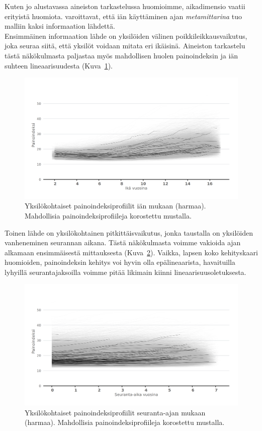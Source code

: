 \documentclass[finnish]{docopts}
\begin{document}
Kuten jo alustavassa aineiston tarkastelussa huomioimme, aikadimensio vaatii erityistä huomiota. \cite{fitzmaurice11} varoittavat, että iän käyttäminen ajan \textit{metamittarina} tuo malliin kaksi informaation lähdettä.\\

Ensimmäinen informaation lähde on yksilöiden välinen poikkileikkausvaikutus, joka seuraa siitä, että yksilöt voidaan mitata eri ikäisinä. Aineiston tarkastelu tästä näkökulmasta paljastaa myös mahdollisen huolen painoindeksin ja iän suhteen lineaarisuudesta (Kuva~\ref{fig:bmi_age}).\\

\begin{figure}[H]
\centering
  \includegraphics[scale=0.8]{kuvaajat/bmi_age.png}
  \caption{Yksilökohtaiset painoindeksiprofiilit iän mukaan (harmaa). Mahdollisia painoindeksiprofiileja korostettu mustalla.}
  \label{fig:bmi_age}
\end{figure}


Toinen lähde on yksilökohtainen pitkittäisvaikutus, jonka taustalla on yksilöiden vanheneminen seurannan aikana. Tästä näkökulmasta voimme vakioida ajan alkamaan ensimmäisestä mittauksesta (Kuva~\ref{fig:bmi_follow}). Vaikka, lapsen koko kehityskaari huomioiden, painoindeksin kehitys voi hyvin olla epälineaarista, havaituilla lyhyillä seurantajaksoilla voimme pitää likimain kiinni lineaarisuusoletuksesta.\\

\begin{figure}[H]
\centering
  \includegraphics[scale=0.8]{kuvaajat/bmi_follow.png}
  \caption{Yksilökohtaiset painoindeksiprofiilit seuranta-ajan mukaan (harmaa). Mahdollisia painoindeksiprofiileja korostettu mustalla.}
  \label{fig:bmi_follow}
\end{figure}
\end{document}
